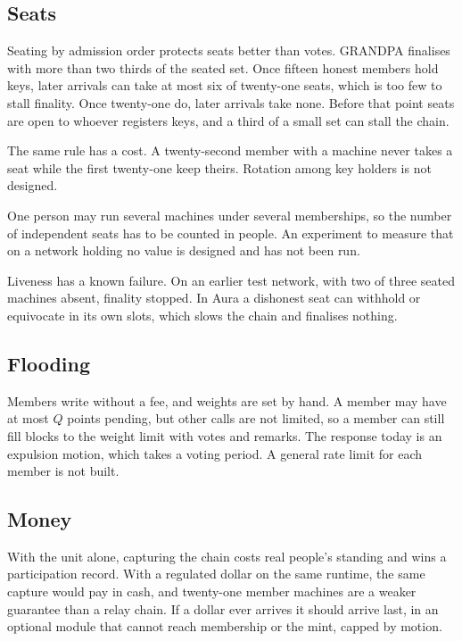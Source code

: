 \documentclass[11pt,a4paper]{article}
\theoremstyle{definition}
\theoremstyle{plain}
\theoremstyle{remark}
\begin{document}
\subsection{Seats}

Seating by admission order protects seats better than votes. GRANDPA finalises with more than two thirds of the seated set. Once fifteen honest members hold keys, later arrivals can take at most six of twenty-one seats, which is too few to stall finality. Once twenty-one do, later arrivals take none. Before that point seats are open to whoever registers keys, and a third of a small set can stall the chain.

The same rule has a cost. A twenty-second member with a machine never takes a seat while the first twenty-one keep theirs. Rotation among key holders is not designed.

One person may run several machines under several memberships, so the number of independent seats has to be counted in people. An experiment to measure that on a network holding no value is designed and has not been run.

Liveness has a known failure. On an earlier test network, with two of three seated machines absent, finality stopped. In Aura a dishonest seat can withhold or equivocate in its own slots, which slows the chain and finalises nothing.

\subsection{Flooding}

Members write without a fee, and weights are set by hand. A member may have at most $Q$ points pending, but other calls are not limited, so a member can still fill blocks to the weight limit with votes and remarks. The response today is an expulsion motion, which takes a voting period. A general rate limit for each member is not built.

\subsection{Money}

With the unit alone, capturing the chain costs real people's standing and wins a participation record. With a regulated dollar on the same runtime, the same capture would pay in cash, and twenty-one member machines are a weaker guarantee than a relay chain. If a dollar ever arrives it should arrive last, in an optional module that cannot reach membership or the mint, capped by motion.
\end{document}
